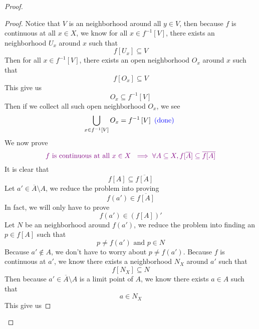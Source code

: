 \documentclass{report}
\begin{document}
\begin{proof}
\begin{proof}
Notice that $V$ is an neighborhood around all  $y\in V$, then because $f$ is continuous at all $x\in X$, we know for all $x\in f^{-1}\left[V \right]$, there exists an neighborhood $U_x$ around  $x$ such that  
\begin{equation*}
f\left[U_x \right]\subseteq V 
\end{equation*}
Then for all $x\in f^{-1}\left[V \right]$, there exists an open neighborhood $O_x$ around  $x$ such that 
\begin{equation*}
f\left[O_x \right]\subseteq V
\end{equation*}
This give us 
\begin{equation*}
O_x \subseteq f^{-1}\left[V \right]
\end{equation*}
Then if we collect all such open neighborhood $O_x$, we see 
 \begin{equation*}
\bigcup_{x\in f^{-1}\left[V \right]}O_x=f^{-1}\left[V \right]\textcolor{blue}{\text{ (done) }}
\end{equation*}
We now prove 
\begin{equation*}
\textcolor{violet}{f\text{ is continuous at all $x\in X$ }\implies \forall A\subseteq X, f[\overline{A}]\subseteq \overline{f[A]}}
\end{equation*}
It is clear that 
\begin{equation*}
f[A]\subseteq \overline{f[A]}
\end{equation*}
Let $a'\in \overline{A}\setminus A$, we reduce the problem into proving 
\begin{equation*}
f(a')\in \overline{f[A]}
\end{equation*}
In fact, we will only have to prove
\begin{equation*}
f(a')\in (f[A])'
\end{equation*}
Let $N$ be an neighborhood around  $f(a')$, we reduce the problem into finding an $p\in  f[A]$ such that
\begin{equation*}
p\neq f(a')\text{ and }p\in N
\end{equation*}
Because $a'\not\in A$, we don't have to worry about  $p\neq f(a')$. Because $f$ is continuous at  $a'$, we know there exists a neighborhood  $N_{X}$ around $a'$ such that 
 \begin{equation*}
f[N_X]\subseteq N
\end{equation*}
Then because $a'\in \overline{A}\setminus A$ is a limit point of $A$, we know there exists  $a \in A$   such that 
\begin{equation*}
a\in N_X
\end{equation*}
This give us 

\end{proof}
\end{proof}
\end{document}
